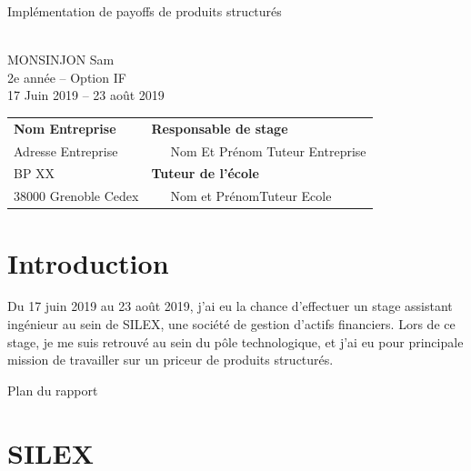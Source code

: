 \documentclass[10pt,a4paper]{article}
\begin{document}
\begin{center}
{\begin{minipage}{1\textwidth}
\begin{center}
{\Huge Implémentation de payoffs de produits structurés}\\
\end{center}
\end{minipage}
}\\
\vspace{3cm}
MONSINJON Sam\\
2e année -- Option IF\\
\vspace{3mm}
17 Juin 2019 -- 23 août 2019\\
\vspace{4cm}
\begin{tabular}{p{10cm}p{10cm}}
{\bf Nom Entreprise}                                            &{\bf Responsable de stage}\\
{\footnotesize Adresse Entreprise}       & ~~~Nom Et Prénom Tuteur Entreprise\\
{\footnotesize BP XX}                                        & {\bf Tuteur de l'école}\\
{\footnotesize 38000 Grenoble Cedex}                          & ~~~Nom et PrénomTuteur Ecole\\
\end{tabular}
\end{center}

\newpage
\tableofcontents
\newpage
\section{Introduction}
Du 17 juin 2019 au 23 août 2019, j'ai eu la chance d'effectuer un stage assistant ingénieur au sein de SILEX, une société de gestion d'actifs financiers. Lors de ce stage, je me suis retrouvé au sein du pôle technologique, et j'ai eu pour principale mission de travailler sur un priceur de produits structurés.

Plan du rapport




\newpage

\section{SILEX}
\end{document}

